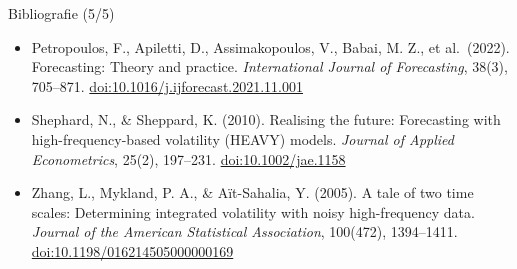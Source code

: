 \begin{frame}{Bibliografie (5/5)}
\begin{itemize}
    \item Petropoulos, F., Apiletti, D., Assimakopoulos, V., Babai, M. Z., et al.\ (2022). Forecasting: Theory and practice. \textit{International Journal of Forecasting}, 38(3), 705--871. \href{https://doi.org/10.1016/j.ijforecast.2021.11.001}{doi:10.1016/j.ijforecast.2021.11.001}
    \item Shephard, N., \& Sheppard, K. (2010). Realising the future: Forecasting with high-frequency-based volatility (HEAVY) models. \textit{Journal of Applied Econometrics}, 25(2), 197--231. \href{https://doi.org/10.1002/jae.1158}{doi:10.1002/jae.1158}
    \item Zhang, L., Mykland, P. A., \& Aït-Sahalia, Y. (2005). A tale of two time scales: Determining integrated volatility with noisy high-frequency data. \textit{Journal of the American Statistical Association}, 100(472), 1394--1411. \href{https://doi.org/10.1198/016214505000000169}{doi:10.1198/016214505000000169}
\end{itemize}
\end{frame}


